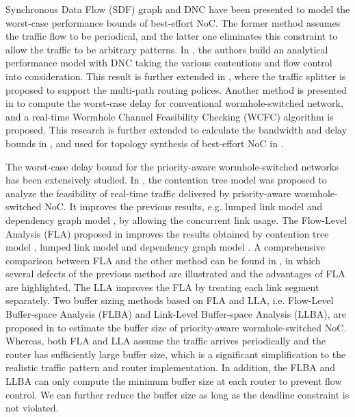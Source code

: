 \documentclass[preprint]{elsarticle}
\begin{document}
Synchronous Data Flow (SDF) graph \cite{poplavko2003task} and DNC \cite{qian2009analysis} have been presented to model the worst-case performance bounds of best-effort NoC. The former method assumes the traffic flow to be periodical, and the latter one eliminates this constraint to allow the traffic to be arbitrary patterns. In \cite{qian2009analysis}, the authors build an analytical performance model with DNC taking the various contentions and flow control into consideration. This result is further extended in \cite{Du:2012:WPA:2380445.2380469}, where the traffic splitter is proposed to support the multi-path routing polices. Another method is presented in \cite{Lee:2003:RWC:846077.846083} to compute the worst-case delay for conventional wormhole-switched network, and a real-time Wormhole Channel Feasibility Checking (WCFC) algorithm is proposed. This research is further extended to calculate the bandwidth and delay bounds in \cite{6109240}, and used for topology synthesis of best-effort NoC in \cite{EPFL-ARTICLE-186879}.

The worst-case delay bound for the priority-aware wormhole-switched networks has been extensively studied. In \cite{LuJS05}, the contention tree model was proposed to analyze the feasibility of real-time traffic delivered by priority-aware wormhole-switched NoC. It improves the previous results, e.g. lumped link model \cite{707545} and dependency graph model \cite{708526}, by allowing the concurrent link usage. The Flow-Level Analysis (FLA) proposed in \cite{Shi:2008:RCA:1397757.1397996} improves the results obtained by contention tree model \cite{LuJS05}, lumped link model \cite{707545} and dependency graph model \cite{708526}. A comprehensive comparison between FLA and the other method can be found in \cite{Shi2009}, in which several defects of the previous method are illustrated and the advantages of FLA are highlighted. The LLA \cite{73} improves the FLA by treating each link segment separately. Two buffer sizing methods based on FLA and LLA, i.e. Flow-Level Buffer-space Analysis (FLBA) and Link-Level Buffer-space Analysis (LLBA), are proposed in \cite{189} to estimate the buffer size of priority-aware wormhole-switched NoC. Whereas, both FLA and LLA assume the traffic arrives periodically and the router has sufficiently large buffer size, which is a significant simplification to the realistic traffic pattern and router implementation. In addition, the FLBA and LLBA can only compute the minimum buffer size at each router to prevent flow control. We can further reduce the buffer size as long as the deadline constraint is not violated.
\end{document}
